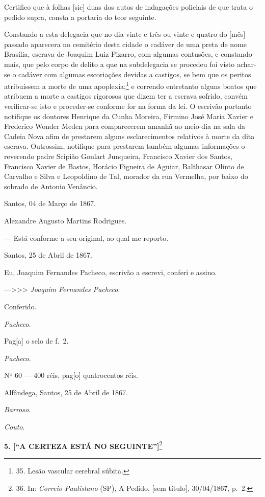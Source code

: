 Certifico que à folhas {[}sic{]} duas dos autos de indagações policiais
de que trata o pedido supra, consta a portaria do teor seguinte.

Constando a esta delegacia que no dia vinte e três ou vinte e quatro do
{[}mês{]} passado aparecera no cemitério desta cidade o cadáver de uma
preta de nome Brasília, escrava de Joaquim Luiz Pizarro, com algumas
contusões, e constando mais, que pelo corpo de delito a que na
subdelegacia se procedeu foi visto achar-se o cadáver com algumas
escoriações devidas a castigos, se bem que os peritos atribuíssem a
morte de uma apoplexia;\footnote{35. Lesão vascular cerebral súbita.} e
correndo entretanto alguns boatos que atribuem a morte a castigos
rigorosos que dizem ter a escrava sofrido, convém verificar-se isto e
proceder-se conforme for na forma da lei. O escrivão portanto notifique
os doutores Henrique da Cunha Moreira, Firmino José Maria Xavier e
Frederico Wonder Meden para comparecerem amanhã ao meio-dia na sala da
Cadeia Nova afim de prestarem alguns esclarecimentos relativos à morte
da dita escrava. Outrossim, notifique para prestarem também algumas
informações o reverendo padre Scipião Goulart Junqueira, Francisco
Xavier dos Santos, Francisco Xavier de Bastos, Horácio Figueira de
Aguiar, Balthasar Olinto de Carvalho e Silva e Leopoldino de Tal,
morador da rua Vermelha, por baixo do sobrado de Antonio Venâncio.

Santos, 04 de Março de 1867.

Alexandre Augusto Martins Rodrigues.

--- Está conforme a seu original, ao qual me reporto.

Santos, 25 de Abril de 1867.

Eu, Joaquim Fernandes Pacheco, escrivão a escrevi, conferi e assino.

---\textgreater\textgreater\textgreater{} \emph{Joaquim Fernandes
Pacheco}.

Conferido.

\emph{Pacheco}.

Pag{[}a{]} o selo de f.~2.

\emph{Pacheco}.

Nº 60 --- 400 réis, pag{[}o{]} quatrocentos réis.

Alfândega, Santos, 25 de Abril de 1867.

\emph{Barroso}.

\emph{Couto}.

\textbf{5. {[}``A CERTEZA ESTÁ NO SEGUINTE''{]}}\footnote{36. In:
  \emph{Correio Paulistano} (SP), A Pedido, {[}sem título{]},
  30/04/1867, p.~2.}

